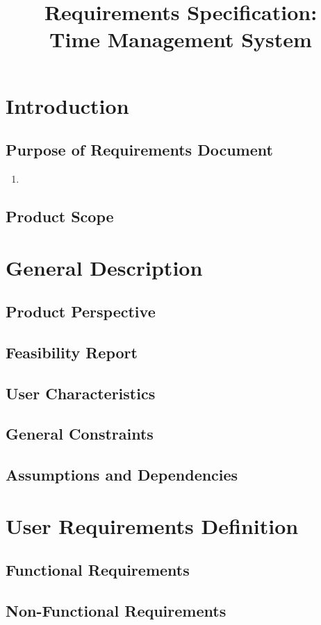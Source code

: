 \documentclass{article}
\title{Requirements Specification: \\ Time Management System}
\date{}
\begin{document}
 
\maketitle
 
\section{Introduction}
\subsection{Purpose of Requirements Document}
\begin{enumerate}
    \item 
\end{enumerate}
\subsection{Product Scope}

\section{General Description}
\subsection{Product Perspective}
\subsection{Feasibility Report}
\subsection{User Characteristics}
\subsection{General Constraints}
\subsection{Assumptions and Dependencies}

\section{User Requirements Definition}
\subsection{Functional Requirements}
\subsection{Non-Functional Requirements}
\end{document}

